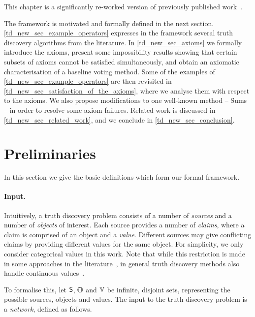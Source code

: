 This chapter is a significantly re-worked version of previously published
work~\cite{singleton_booth_2020,singleton2022towards}.

\begin{chapteroutline}

    The framework is motivated and formally defined in the next section.
    \cref{td_new_sec_example_operators} expresses in the framework several
    truth discovery algorithms from the literature.
    In \cref{td_new_sec_axioms} we formally introduce the axioms, present some
    impossibility results showing that certain subsets of axioms cannot be
    satisfied simultaneously, and obtain an axiomatic characterisation of a
    baseline voting method.
    Some of the examples of \cref{td_new_sec_example_operators} are then
    revisited in \cref{td_new_sec_satisfaction_of_the_axioms}, where we analyse
    them with respect to the axioms. We also propose modifications to one
    well-known method -- Sums -- in order to resolve some axiom failures.
    Related work is discussed in \cref{td_new_sec_related_work}, and we
    conclude in \cref{td_new_sec_conclusion}.
\end{chapteroutline}

\section{Preliminaries}
\label{td_new_sec_preliminaries}

In this section we give the basic definitions which form our formal framework.

\paragraph{Input.}

Intuitively, a truth discovery problem consists of a number of \emph{sources}
and a number of \emph{objects} of interest. Each source provides a number of
\emph{claims}, where a claim is comprised of an object and a \emph{value}.
Different sources may give conflicting claims by providing different values for
the same object. For simplicity, we only consider categorical values in this
work. Note that while this restriction is made in some approaches in the
literature~\cite{pasternack2010,yin2008,wang_truth_2012,dong_truth_2009,zhang2018},
in general truth discovery methods also handle continuous
values~\cite{li2016,xiao2016}.

To formalise this, let $\S$, $\O$ and $\V$ be infinite, disjoint sets,
representing the possible sources, objects and values. The input to the truth
discovery problem is a \emph{network}, defined as follows.

